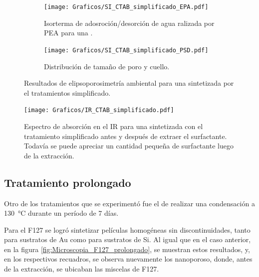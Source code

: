 {		\begin{figure}[!ht]	
			\begin{subfigure}[t]{0.495\textwidth}
		  	\texttt{[image: Graficos/SI\_CTAB\_simplificado\_EPA.pdf]}
			\caption{Isorterma de adosroción/desorción de agua ralizada por PEA para una \pdmC.}
			\label{fig:CTAB_simplificado_EPA}
			\end{subfigure}
			\begin{subfigure}[t]{0.495\textwidth}
		  	\texttt{[image: Graficos/SI\_CTAB\_simplificado\_PSD.pdf]}
			\caption{Distribución de tamaño de poro y cuello.\\ }
			\label{fig:CTAB_simplificado_PSD}
			\end{subfigure}
			\caption[Elipsoporosimetría \pdmC\space tratamiento simplificado.]{Resultados de elipsoporosimetría ambiental para una \pdmC\space sintetizada por el tratamientos simplificado.}
			\end{figure}
		
		\begin{figure}[!ht]
			\begin{center}
			\texttt{[image: Graficos/IR\_CTAB\_simplificado.pdf]}
			\caption[FTIR \pdmC\space tratamiento simplificado.]{Espectro de absorción en el IR para una \pdmC\space sintetizada con el tratamiento simplificado antes y después de extraer el surfactante. Todavía se puede apreciar un cantidad pequeña de surfactante luego de la extracción.}
			\label{fig:IR_CTAB_simplificado}
			\end{center}
			\end{figure}	

	\subsection{Tratamiento prolongado}

		Otro de los tratamientos que se experimentó fue el de realizar una condensación a \SI{130}{\celsius} durante un período de 7 días. 

		Para el F127 se logró sintetizar películas homogéneas sin discontinuidades, tanto para sustratos de Au como para sustratos de Si. Al igual que en el caso anterior, en la figura \ref{fig:Microscopia_F127_prolongado}, se muestran estos resultados, y, en los respectivos recuadros, se observa nuevamente los nanoporoso, donde, antes de la extracción, se ubicaban las miscelas de F127. 

}
